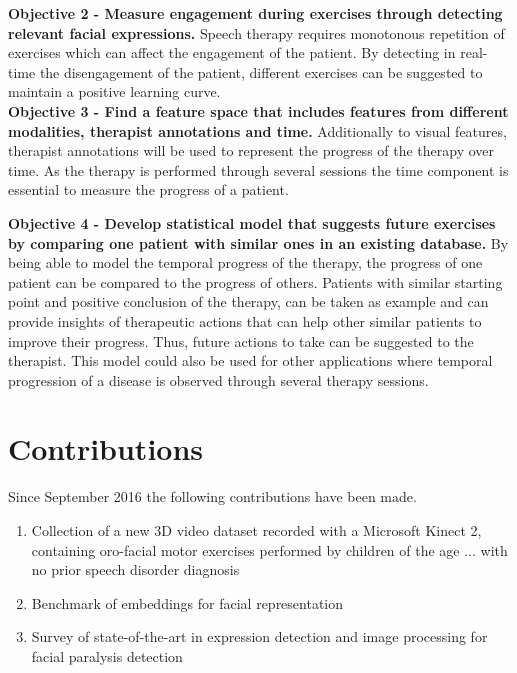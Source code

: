\textbf{Objective 2 - Measure engagement during exercises through detecting relevant facial expressions.} Speech therapy requires monotonous repetition of exercises which can affect the engagement of the patient. By detecting in real-time the disengagement of the patient, different exercises can be suggested to maintain a positive learning curve. \\

\textbf{Objective 3 - Find a feature space that includes features from different modalities, therapist annotations and time.}
Additionally to visual features, therapist annotations will be used to represent the progress of the therapy over time. As the therapy is performed through several sessions the time component is essential to measure the progress of a patient. 

\textbf{Objective 4 - Develop statistical model that suggests future exercises by comparing one patient with similar ones in an existing database.} By being able to model the temporal progress of the therapy, the progress of one patient can be compared to the progress of others. Patients with similar starting point and positive conclusion of the therapy, can be taken as example and can provide insights of therapeutic actions that can help other similar patients to improve their progress. Thus, future actions to take can be suggested to the therapist. This model could also be used for other applications where temporal progression of a disease is observed through several therapy sessions.  

\begin{comment}
Considering clinical medical data existing in the Electronic Health Records, in particular, multimodal time series of data from health sensors and medical notes collected at each patient visit, we wish to recognize health/clinical patterns to support health professionals in their decisions through (i) suggestions and (ii) similar examples.
\end{comment}

\section{Contributions}

Since September 2016 the following contributions have been made.
\begin{enumerate}
\item Collection of a new 3D video dataset recorded with a Microsoft Kinect 2,  containing oro-facial motor exercises performed by children of the age ... with no prior speech disorder diagnosis 
\item Benchmark of embeddings for facial representation
\item Survey of state-of-the-art in expression detection and image processing for facial paralysis detection
\end{enumerate} 



